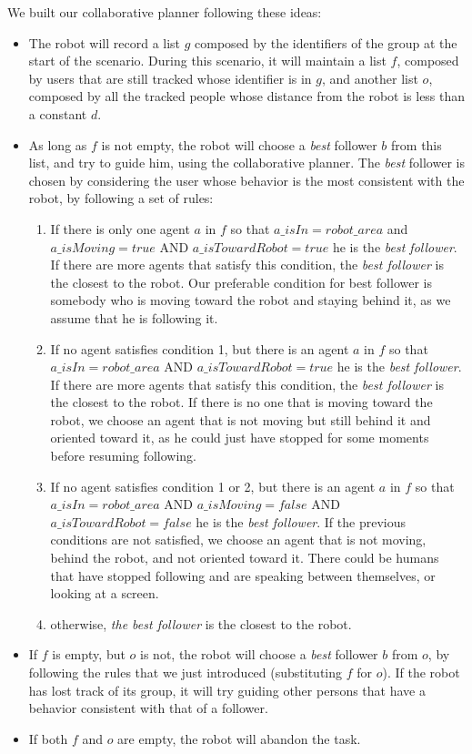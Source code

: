 
We built our collaborative planner following these ideas:
\begin{itemize}
\item The robot will record a list $g$ composed by the identifiers of the group at the start of the scenario. During this scenario, it will maintain a list $f$, composed by users that are still tracked whose identifier is in $g$, and another list $o$, composed by all the tracked people whose distance from the robot is less than a constant $d$. 
\item As long as $f$ is not empty, the robot will choose a \textit{best} follower $b$ from this list, and try to guide him, using the collaborative planner. The \textit{best} follower is chosen by considering the user whose behavior is the most consistent with the robot, by following a set of rules:
	\begin{enumerate}
		\item If there is only one agent $a$ in $f$ so that $a\_isIn=robot\_area$ and $a\_isMoving=true$ AND $a\_isTowardRobot=true$ he is the \textit{best follower}. If there are more agents that satisfy this condition, the \textit{best follower} is the closest to the robot. Our preferable condition for best follower is somebody who is moving toward the robot and staying behind it, as we assume that he is following it.
		\item If no agent satisfies condition 1, but there is an agent $a$ in $f$ so that $a\_isIn=robot\_area$ AND $a\_isTowardRobot=true$ he is the \textit{best follower}. If there are more agents that satisfy this condition, the \textit{best follower} is the closest to the robot. If there is no one that is moving toward the robot, we choose an agent that is not moving but still behind it and oriented toward it, as he could just have stopped for some moments before resuming following.
		\item If no agent satisfies condition 1 or 2, but there is an agent $a$ in $f$ so that $a\_isIn=robot\_area$ AND $a\_isMoving=false$ AND $a\_isTowardRobot=false$ he is the \textit{best follower}. If the previous conditions are not satisfied, we choose an agent that is not moving, behind the robot, and not oriented toward it. There could be humans that have stopped following and are speaking between themselves, or looking at a screen.
		\item otherwise, \textit{the best follower} is the closest to the robot.
	\end{enumerate}
\item If $f$ is empty, but $o$ is not, the robot will choose a \textit{best} follower $b$ from $o$, by following the rules that we just introduced (substituting $f$ for $o$). If the robot has lost track of its group, it will try guiding other persons that have a behavior consistent with that of a follower.  
\item If  both $f$ and $o$ are empty, the robot will abandon the task.
\end{itemize}

